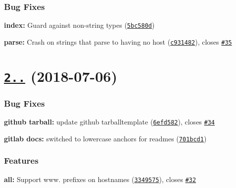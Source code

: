 \subsubsection*{Bug Fixes}


\begin{DoxyItemize}
\item {\bfseries index\+:} Guard against non-\/string types (\href{https://github.com/npm/hosted-git-info/commit/5bc580d}{\tt 5bc580d})
\item {\bfseries parse\+:} Crash on strings that parse to having no host (\href{https://github.com/npm/hosted-git-info/commit/c931482}{\tt c931482}), closes \href{https://github.com/npm/hosted-git-info/issues/35}{\tt \#35}
\end{DoxyItemize}

\label{_2.7.0}%
 \section*{\href{https://github.com/npm/hosted-git-info/compare/v2.6.1...v2.7.0}{\tt 2..} (2018-\/07-\/06)}

\subsubsection*{Bug Fixes}


\begin{DoxyItemize}
\item {\bfseries github tarball\+:} update github tarballtemplate (\href{https://github.com/npm/hosted-git-info/commit/6efd582}{\tt 6efd582}), closes \href{https://github.com/npm/hosted-git-info/issues/34}{\tt \#34}
\item {\bfseries gitlab docs\+:} switched to lowercase anchors for readmes (\href{https://github.com/npm/hosted-git-info/commit/701bcd1}{\tt 701bcd1})
\end{DoxyItemize}

\subsubsection*{Features}


\begin{DoxyItemize}
\item {\bfseries all\+:} Support www. prefixes on hostnames (\href{https://github.com/npm/hosted-git-info/commit/3349575}{\tt 3349575}), closes \href{https://github.com/npm/hosted-git-info/issues/32}{\tt \#32}
\end{DoxyItemize}

